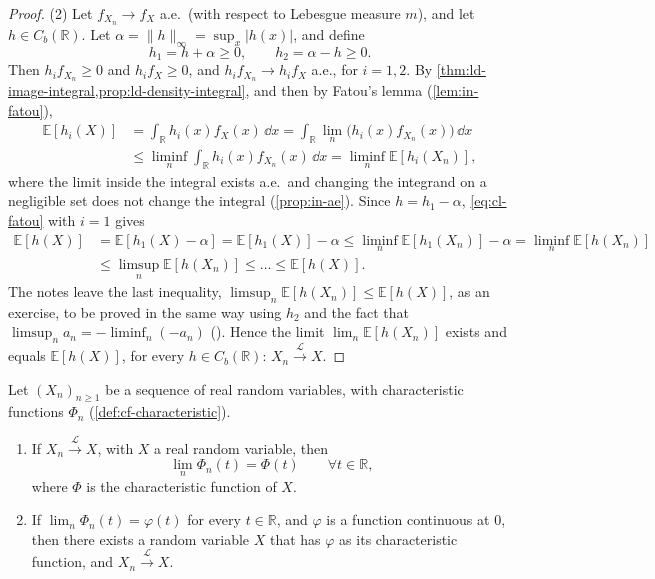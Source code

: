 \begin{proof}
(2) Let $f_{X_n}\to f_X$ a.e.\ (with respect to Lebesgue measure $m$), and let
$h\in C_b(\mathbb R)$. Let $\alpha=\|h\|_\infty=\sup_x|h(x)|$, and define
\[
  h_1=h+\alpha\ge0,\qquad h_2=\alpha-h\ge0 .
\]
Then $h_if_{X_n}\ge0$ and $h_if_X\ge0$, and $h_if_{X_n}\to h_if_X$ a.e., for $i=1,2$. By
\cref{thm:ld-image-integral,prop:ld-density-integral}, and then by Fatou's lemma
(\cref{lem:in-fatou}),
\begin{equation}\label{eq:cl-fatou}
\begin{aligned}
  \mathbb E[h_i(X)]&=\int_{\mathbb R}h_i(x)f_X(x)\,\dd x=\int_{\mathbb R}\lim_n\big(h_i(x)f_{X_n}(x)\big)\,\dd x\\
  &\le\liminf_n\int_{\mathbb R}h_i(x)f_{X_n}(x)\,\dd x=\liminf_n\mathbb E[h_i(X_n)] ,
\end{aligned}
\end{equation}
where the limit inside the integral exists a.e.\ and changing the integrand on a negligible
set does not change the integral (\cref{prop:in-ae}). Since $h=h_1-\alpha$, \eqref{eq:cl-fatou}
with $i=1$ gives
\[
\begin{aligned}
  \mathbb E[h(X)]&=\mathbb E[h_1(X)-\alpha]=\mathbb E[h_1(X)]-\alpha
  \le\liminf_n\mathbb E[h_1(X_n)]-\alpha=\liminf_n\mathbb E[h(X_n)]\\
  &\le\limsup_n\mathbb E[h(X_n)]\le\dots\le\mathbb E[h(X)] .
\end{aligned}
\]
The notes leave the last inequality, $\limsup_n\mathbb E[h(X_n)]\le\mathbb E[h(X)]$, as an
exercise, to be proved in the same way using $h_2$ and the fact that
$\limsup_na_n=-\liminf_n(-a_n)$ (). Hence the limit
$\lim_n\mathbb E[h(X_n)]$ exists and equals $\mathbb E[h(X)]$, for every $h\in C_b(\mathbb R)$:
$X_n\xrightarrow{\mathcal L}X$.
\end{proof}

\begin{theorem}\label{thm:cl-levy}
Let $(X_n)_{n\ge1}$ be a sequence of real random variables, with characteristic functions
$\Phi_n$ (\cref{def:cf-characteristic}).
\begin{enumerate}[label=(\arabic*)]
  \item If $X_n\xrightarrow{\mathcal L}X$, with $X$ a real random variable, then
    \[
      \lim_n\Phi_n(t)=\Phi(t)\qquad\forall t\in\mathbb R,
    \]
    where $\Phi$ is the characteristic function of $X$.
  \item If $\lim_n\Phi_n(t)=\varphi(t)$ for every $t\in\mathbb R$, and $\varphi$ is a function
    continuous at $0$, then there exists a random variable $X$ that has $\varphi$ as its
    characteristic function, and $X_n\xrightarrow{\mathcal L}X$.
\end{enumerate}
\end{theorem}

